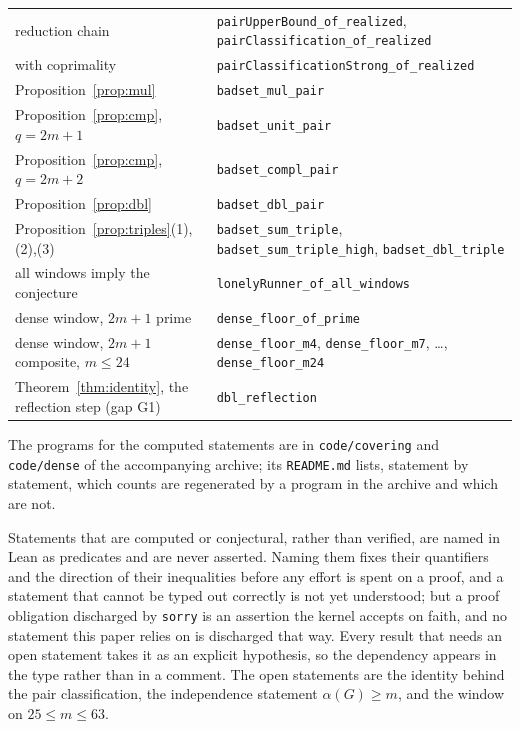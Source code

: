 \documentclass[11pt]{amsart}
\theoremstyle{plain}
\theoremstyle{definition}
\begin{document}
\begin{center}
\begin{tabular}{@{}ll@{}}
\quad reduction chain & \texttt{pairUpperBound\_of\_realized}, \texttt{pairClassification\_of\_realized} \\
\quad with coprimality & \texttt{pairClassificationStrong\_of\_realized} \\
Proposition~\ref{prop:mul} & \texttt{badset\_mul\_pair} \\
Proposition~\ref{prop:cmp}, $q = 2m+1$ & \texttt{badset\_unit\_pair} \\
Proposition~\ref{prop:cmp}, $q = 2m+2$ & \texttt{badset\_compl\_pair} \\
Proposition~\ref{prop:dbl} & \texttt{badset\_dbl\_pair} \\
Proposition~\ref{prop:triples}(1),(2),(3) & \texttt{badset\_sum\_triple}, \texttt{badset\_sum\_triple\_high}, \texttt{badset\_dbl\_triple} \\
all windows imply the conjecture & \texttt{lonelyRunner\_of\_all\_windows} \\
dense window, $2m+1$ prime & \texttt{dense\_floor\_of\_prime} \\
dense window, $2m+1$ composite, $m \le 24$ & \texttt{dense\_floor\_m4}, \texttt{dense\_floor\_m7}, \dots, \texttt{dense\_floor\_m24} \\
Theorem~\ref{thm:identity}, the reflection step (gap G1) & \texttt{dbl\_reflection} \\
\bottomrule
\end{tabular}
\end{center}

The programs for the computed statements are in \texttt{code/covering} and \texttt{code/dense} of the
accompanying archive; its \texttt{README.md} lists, statement by statement, which counts are regenerated by a
program in the archive and which are not.

Statements that are computed or conjectural, rather than verified, are named in Lean as predicates
and are never asserted. Naming them fixes their quantifiers and the direction of their inequalities
before any effort is spent on a proof, and a statement that cannot be typed out correctly is not yet
understood; but a proof obligation discharged by \texttt{sorry} is an assertion the kernel accepts
on faith, and no statement this paper relies on is discharged that way. Every result that needs an
open statement takes it as an
explicit hypothesis, so the dependency appears in the type rather than in a comment. The open
statements are the identity behind the pair classification, the independence statement
$\alpha(G) \ge m$, and the window on $25 \le m \le 63$.
\end{document}
